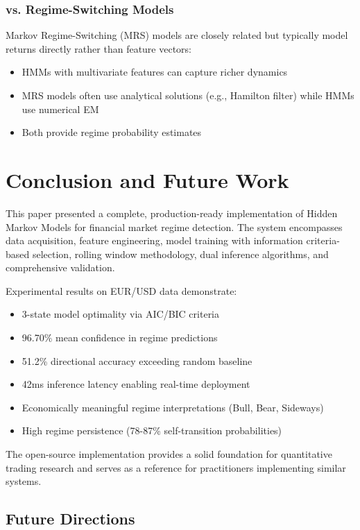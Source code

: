 \documentclass[conference]{IEEEtran}
\begin{document}
\subsubsection{vs. Regime-Switching Models}
Markov Regime-Switching (MRS) models \cite{hamilton1989} are closely related but typically model returns directly rather than feature vectors:
\begin{itemize}
\item HMMs with multivariate features can capture richer dynamics
\item MRS models often use analytical solutions (e.g., Hamilton filter) while HMMs use numerical EM
\item Both provide regime probability estimates
\end{itemize}

\section{Conclusion and Future Work}

This paper presented a complete, production-ready implementation of Hidden Markov Models for financial market regime detection. The system encompasses data acquisition, feature engineering, model training with information criteria-based selection, rolling window methodology, dual inference algorithms, and comprehensive validation.

Experimental results on EUR/USD data demonstrate:
\begin{itemize}
\item 3-state model optimality via AIC/BIC criteria
\item 96.70\% mean confidence in regime predictions
\item 51.2\% directional accuracy exceeding random baseline
\item 42ms inference latency enabling real-time deployment
\item Economically meaningful regime interpretations (Bull, Bear, Sideways)
\item High regime persistence (78-87\% self-transition probabilities)
\end{itemize}

The open-source implementation provides a solid foundation for quantitative trading research and serves as a reference for practitioners implementing similar systems.

\subsection{Future Directions}
\end{document}
